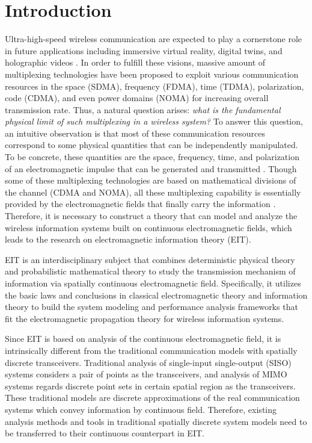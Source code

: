 \documentclass[journal,twocolumn]{IEEEtran}
\begin{document}
\section{Introduction}
Ultra-high-speed wireless communication are expected to play a cornerstone role in future applications including immersive virtual reality, digital twins, and holographic videos \cite{saad2019vision}. 
In order to fulfill these visions, massive amount of multiplexing technologies have been proposed to exploit various communication resources in the space (SDMA), frequency (FDMA), time (TDMA), polarization, code (CDMA), and even power domains (NOMA) for increasing overall transmission rate. 
Thus, a natural question arises: {\it what is the fundamental physical limit of such multiplexing in a wireless system?}
To answer this question, an intuitive observation is that most of these communication resources correspond to some physical quantities that can be independently manipulated. To be concrete, these quantities are the space, frequency, time, and polarization of an electromagnetic impulse that can be generated and transmitted \cite{shah2022survey}. Though some of these multiplexing technologies are based on mathematical divisions of the channel (CDMA and NOMA), all these multiplexing capability is essentially provided by the electromagnetic fields that finally carry the information \cite{gruber2008new}. Therefore, it is necessary to construct a theory that can model and analyze the wireless information systems built on continuous electromagnetic fields, which leads to the research on electromagnetic information theory (EIT).

EIT is an interdisciplinary subject that combines deterministic physical theory and probabilistic mathematical theory to study the transmission mechanism of information via spatially continuous electromagnetic field. 
Specifically, it utilizes the basic laws and conclusions in classical electromagnetic theory and information theory to build the system modeling and performance analysis frameworks that fit the electromagnetic propagation theory for wireless information systems. 

Since EIT is based on analysis of the continuous electromagnetic field, it is intrinsically different from the traditional communication models with spatially discrete transceivers. 
Traditional analysis of single-input single-output (SISO) systems considers a pair of points as the transceivers, and analysis of MIMO systems regards discrete point sets in certain spatial region as the transceivers. 
These traditional models are discrete approximations of the real communication systems which convey information by continuous field. 
Therefore, existing analysis methods and tools in traditional spatially discrete system models need to be transferred to their continuous counterpart in EIT. 
\end{document}
